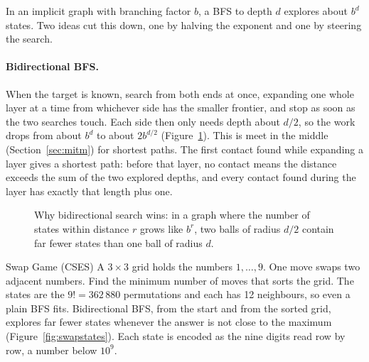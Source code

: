 In an implicit graph with branching factor $b$, a BFS to depth $d$ explores about $b^d$ states. Two ideas cut this down, one
by halving the exponent and one by steering the search.

\paragraph{Bidirectional BFS.} When the target is known, search from both ends at once, expanding one whole layer at a time
from whichever side has the smaller frontier, and stop as soon as the two searches touch. Each side then only needs depth about
$d/2$, so the work drops from about $b^d$ to about $2b^{d/2}$ (Figure~\ref{fig:bibfs}). This is meet in the middle
(Section~\ref{sec:mitm}) for shortest paths. The first contact found while expanding a layer gives a shortest path: before that
layer, no contact means the distance exceeds the sum of the two explored depths, and every contact found during the layer has
exactly that length plus one.

\begin{figure}[htbp]
\centering
{}
\caption{Why bidirectional search wins: in a graph where the number of states within distance $r$ grows like $b^r$, two balls
of radius $d/2$ contain far fewer states than one ball of radius $d$.}
\label{fig:bibfs}
\end{figure}

\begin{problem}{Swap Game (CSES)}
A $3 \times 3$ grid holds the numbers $1, \ldots, 9$. One move swaps two adjacent numbers. Find the minimum number of moves
that sorts the grid.
\solution The states are the $9! = 362\,880$ permutations and each has 12 neighbours, so even a plain BFS fits. Bidirectional
BFS, from the start and from the sorted grid, explores far fewer states whenever the answer is not close to the maximum
(Figure~\ref{fig:swapstates}). Each state is encoded as the nine digits read row by row, a number below $10^9$.
\end{problem}

